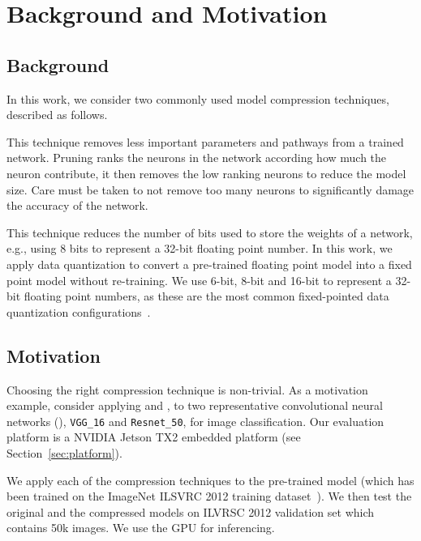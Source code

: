 
\section{Background and Motivation}
\subsection{Background}
In this work, we consider two commonly used model compression techniques, described as follows.

 This technique removes less important parameters and pathways from a trained network. Pruning ranks the neurons in
the network according how much the neuron contribute, it then removes the low ranking neurons to reduce the model size. Care must be taken
to not remove too many neurons to significantly damage the accuracy of the network.

 This technique reduces the number of bits used to store the weights of a network, e.g., using 8 bits to
represent a 32-bit floating point number. In this work, we apply data quantization to convert a pre-trained floating point model into a
fixed point model without re-training. We use 6-bit, 8-bit and 16-bit to represent a 32-bit floating point numbers, as these are the most
common fixed-pointed data quantization configurations~\cite{pacq}.



\subsection{Motivation}
Choosing the right compression technique is non-trivial. As a motivation example, consider applying \pruning and \dquantization, to two
representative convolutional neural networks (\CNN), \texttt{VGG\_16} 	and \texttt{Resnet\_50}, for image classification. Our evaluation
platform is a NVIDIA Jetson TX2 embedded platform (see Section~\ref{sec:platform}).

 We apply each of the compression techniques to the pre-trained model (which has been trained on the ImageNet ILSVRC
2012 training dataset~\cite{imagenet2012}). We then test the original and the compressed models on ILVRSC 2012 validation set which
contains 50k images. We use the GPU for inferencing.

